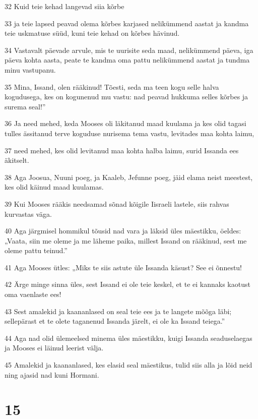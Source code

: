 \par 32 Kuid teie kehad langevad siia kõrbe
\par 33 ja teie lapsed peavad olema kõrbes karjased nelikümmend aastat ja kandma teie uskmatuse süüd, kuni teie kehad on kõrbes hävinud.
\par 34 Vastavalt päevade arvule, mis te uurisite seda maad, nelikümmend päeva, iga päeva kohta aasta, peate te kandma oma pattu nelikümmend aastat ja tundma minu vastupanu.
\par 35 Mina, Issand, olen rääkinud! Tõesti, seda ma teen kogu selle halva kogudusega, kes on kogunenud mu vastu: nad peavad hukkuma selles kõrbes ja surema seal!”
\par 36 Ja need mehed, keda Mooses oli läkitanud maad kuulama ja kes olid tagasi tulles ässitanud terve koguduse nurisema tema vastu, levitades maa kohta laimu,
\par 37 need mehed, kes olid levitanud maa kohta halba laimu, surid Issanda ees äkitselt.
\par 38 Aga Joosua, Nuuni poeg, ja Kaaleb, Jefunne poeg, jäid elama neist meestest, kes olid käinud maad kuulamas.
\par 39 Kui Mooses rääkis needsamad sõnad kõigile Iisraeli lastele, siis rahvas kurvastas väga.
\par 40 Aga järgmisel hommikul tõusid nad vara ja läksid üles mäestikku, öeldes: „Vaata, siin me oleme ja me läheme paika, millest Issand on rääkinud, sest me oleme pattu teinud.”
\par 41 Aga Mooses ütles: „Miks te siis astute üle Issanda käsust? See ei õnnestu!
\par 42 Ärge minge sinna üles, sest Issand ei ole teie keskel, et te ei kannaks kaotust oma vaenlaste ees!
\par 43 Sest amalekid ja kaananlased on seal teie ees ja te langete mõõga läbi; sellepärast et te olete taganenud Issanda järelt, ei ole ka Issand teiega.”
\par 44 Aga nad olid ülemeelsed minema üles mäestikku, kuigi Issanda seaduselaegas ja Mooses ei läinud leerist välja.
\par 45 Amalekid ja kaananlased, kes elasid seal mäestikus, tulid siis alla ja lõid neid ning ajasid nad kuni Hormani.

\chapter{15}

